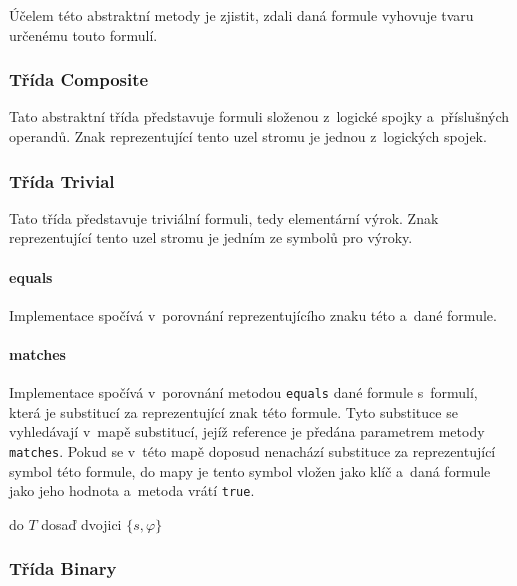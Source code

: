 \documentclass[thesis=B,czech,hidelinks]{thesis}[2012/06/26]
\begin{document}
Účelem této abstraktní metody je zjistit, zdali daná formule vyhovuje tvaru určenému touto formulí.

\subsubsection{Třída Composite}

Tato abstraktní třída představuje formuli složenou z~logické spojky a~příslušných operandů. Znak reprezentující tento uzel stromu je jednou z~logických spojek.

\subsubsection{Třída Trivial}

Tato třída představuje triviální formuli, tedy elementární výrok. Znak reprezentující tento uzel stromu je jedním ze symbolů pro výroky.

\paragraph{equals}

Implementace spočívá v~porovnání reprezentujícího znaku této a~dané formule.

\paragraph{matches}

Implementace spočívá v~porovnání metodou \texttt{equals} dané formule s~formulí, která je substitucí za reprezentující znak této formule. Tyto substituce se vyhledávají v~mapě substitucí, jejíž reference je předána parametrem metody \texttt{matches}. Pokud se v~této mapě doposud nenachází substituce za reprezentující symbol této formule, do mapy je tento symbol vložen jako klíč a~daná formule jako jeho hodnota a~metoda vrátí \texttt{true}.

\begin{algorithm}
{
	\;
}
\Else
{
	do $T$ dosaď dvojici $\{s, \varphi\}$\;
	\;
}
\end{algorithm}

\subsubsection{Třída Binary}
\end{document}
